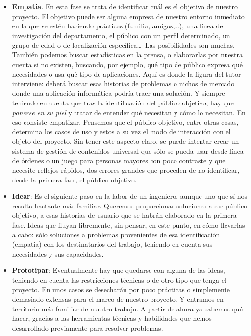 \documentclass[twoside,10pt]{article}
\begin{document}
\begin{multicols}{2}
\begin{itemize}
\item {\bf Empatía}. En esta fase se trata de identificar cuál es el
  objetivo de nuestro proyecto. El objetivo puede ser alguna empresa de
  nuestro entorno inmediato en la que se estén haciendo prácticas (familia,
amigos,\ldots), una línea de investigación del departamento, el público con un
perfil determinado, un grupo de edad o de localización 
específica\ldots\ Las
posibilidades son muchas. También podemos
buscar  estadísticas en la prensa, o elaborarlas por nuestra cuenta si
no existen, buscando, por ejemplo, qué tipo de público expresa qué
necesidades o usa qué tipo de aplicaciones. Aquí es donde la
figura del tutor interviene: deberá buscar esas historias de problemas o nichos
de mercado donde una aplicación informática podría traer una solución. Y
siempre teniendo en cuenta que tras la identificación del público objetivo, hay
que {\em
    ponerse en su piel} y tratar de entender qué necesitan y cómo lo
  necesitan. En eso consiste empatizar.  
Pensemos que el público objetivo, entre otras cosas, determina los casos de
uso y estos a su vez el modo de interacción con el objeto del proyecto. Sin tener este
aspecto claro, se puede intentar crear un sistema de gestión de contenidos
universal que sólo se pueda usar desde línea de órdenes o un juego para
personas mayores con poco contraste y que necesite reflejos rápidos,
dos errores grandes que proceden de no identificar, desde la primera
fase, el público objetivo. 
\item {\bf Idear}: Es el siguiente paso en la labor de un
  ingeniero, aunque uno que sí nos resulta bastante más
  familiar. Queremos proporcionar soluciones a ese público objetivo, a
  esas 
historias de usuario que se habrán elaborado en la primera fase. Ideas que
fluyan libremente, sin pensar, en este punto, en cómo llevarlas a cabo: sólo
soluciones a problemas provenientes de esa identificación (empatía) con los
destinatarios del trabajo, teniendo en cuenta sus necesidades y sus capacidades.
\item {\bf Prototipar}: Eventualmente hay que quedarse con alguna de
  las ideas, teniendo en cuenta las restricciones técnicas o de otro
  tipo que tenga el proyecto. En  unos casos  se desecharán por poco prácticas o simplemente
  demasiado extensas para el marco de nuestro proyecto. Y entramos en
territorio más familiar de nuestro trabajo. A partir de ahora ya sabemos qué
hacer, gracias a las herramientas técnicas y habilidades que hemos
desarrollado previamente para resolver problemas.   
\end{itemize}


\end{multicols}
\end{document}
